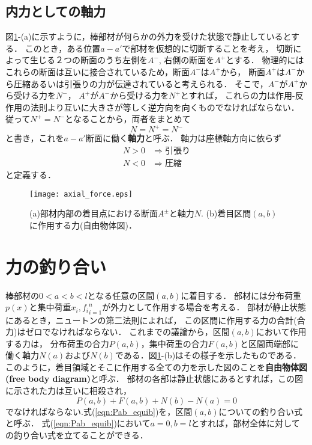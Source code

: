 \documentclass[10pt,a4j]{jbook}
\begin{document}
\subsection{内力としての軸力}
図\ref{fig:defN}-(a)に示すように，棒部材が何らかの外力を受けた状態で静止しているとする．
このとき，ある位置$a-a'$で部材を仮想的に切断することを考え，
切断によって生じる２つの断面のうち左側を$A^-$, 右側の断面を$A^+$とする．
物理的にはこれらの断面は互いに接合されているため，断面$A^-$は$A^+$から，
断面$A^+$は$A^-$から圧縮あるいは引張りの力が伝達されていると考えられる．
そこで，$A^−$が$A^+$から受ける力を$N^-$，
$A^+$が$A^-$から受ける力を$N^+$とすれば，
これらの力は作用-反作用の法則より互いに大きさが等しく逆方向を向くものでなければならない．
従って$N^+=N^-$となることから，両者をまとめて
\begin{equation}
	N=N^+=N^-
	\label{Npm}
\end{equation}
と書き，これを$a-a'$断面に働く{\rm \bf 軸力}と呼ぶ．
軸力は座標軸方向に依らず
\[
\begin{array}{cl}
	N>0 & \Rightarrow 引張り　\\
	N<0 & \Rightarrow 圧縮
\end{array}
\]
と定義する．
\begin{figure}[h]
	\begin{center}
	\texttt{[image: axial\_force.eps]} 
	\end{center}
	\caption{(a)部材内部の着目点における断面$A^{\pm}$と軸力$N$.
	(b)着目区間$(a,b)$に作用する力(自由物体図)．} 
	\label{fig:defN}
\end{figure}
\section{力の釣り合い}
棒部材の$0<a<b<l$となる任意の区間$(a,b)$に着目する．
部材には分布荷重$p(x)$と集中荷重${x_i, f_i}_{i=1}^n$が外力として作用する場合を考える．
部材が静止状態にあるとき，ニュートンの第二法則によれば，
この区間に作用する力の合計(合力)はゼロでなければならない．
これまでの議論から，区間$(a,b)$において作用する力は，
分布荷重の合力$P(a,b)$，集中荷重の合力$F(a,b)$と区間両端部に
働く軸力$N(a)$および$N(b)$である．図\ref{fig:defN}-(b)はその様子を示したものである．
このように，着目領域とそこに作用する全ての力を示した図のことを{\rm \bf 自由物体図(free body diagram)}と呼ぶ．
部材の各部は静止状態にあるとすれば，この図に示された力は互いに相殺され，
\begin{equation}
	P(a,b)+F(a,b)+N(b)-N(a)=0
	\label{eqn:Pab_equib}
\end{equation}
でなければならない.式(\ref{eqn:Pab_equib})を，区間$(a,b)$についての釣り合い式と呼ぶ．
式(\ref{eqn:Pab_equib})において$a=0, b=l$とすれば，部材全体に対しての釣り合い式を立てることができる．
\\
\end{document}

